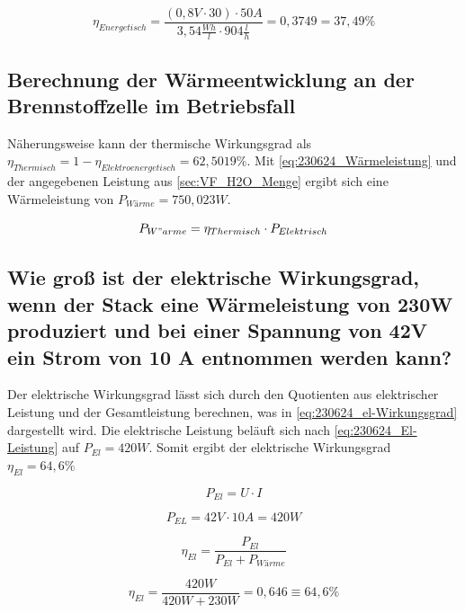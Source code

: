 $$\eta_{Energetisch} = \frac{(0,8V \cdot 30) \cdot 50A}{3,54 \frac{Wh}{l} \cdot 904 \frac{l}{h}}=0,3749=37,49 \%$$

\subsection{Berechnung der Wärmeentwicklung an der Brennstoffzelle im Betriebsfall}

Näherungsweise kann der thermische Wirkungsgrad als $\eta_{Thermisch} = 1 - \eta_{Elektroenergetisch} = 62,5019 \%$.
Mit \autoref{eq:230624_Wärmeleistung} und der angegebenen Leistung aus \autoref{sec:VF_H2O_Menge} ergibt sich eine Wärmeleistung von $P_{Wärme} = 750,023 W$. 

\begin{equation}
    P_{W"arme} = \eta_{Thermisch} \cdot P_{Elektrisch}
    \label{eq:230624_Wärmeleistung}
\end{equation}

\subsection{Wie groß ist der elektrische Wirkungsgrad, wenn der Stack eine Wärmeleistung von
230W produziert und bei einer Spannung von 42V ein Strom von 10 A entnommen werden kann?}

Der elektrische Wirkungsgrad lässt sich durch den Quotienten aus elektrischer Leistung und der Gesamtleistung berechnen, was in \autoref{eq:230624_el-Wirkungsgrad} dargestellt wird. 
Die elektrische Leistung beläuft sich nach \autoref{eq:230624_El-Leistung} auf $P_{El} = 420W$. Somit ergibt der elektrische Wirkungsgrad $\eta_{El} = 64,6\%$

\begin{equation}
    P_{El} = U \cdot I
    \label{eq:230624_El-Leistung}
\end{equation}

$$P_{EL} = 42V \cdot 10A = 420W$$

\begin{equation}
    \eta_{El} = \frac{P_{El}}{P_{El} + P_{Wärme}} 
    \label{eq:230624_el-Wirkungsgrad}
\end{equation}

$$\eta_{El}= \frac{420 W}{420 W + 230 W} = 0,646 \equiv 64,6 \%$$